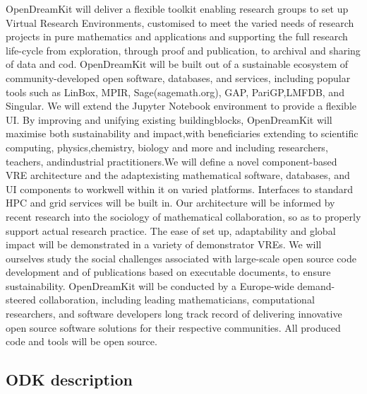 \documentclass[12pt]{amsbook}
\begin{document}
OpenDreamKit will deliver a flexible toolkit enabling research groups to set up Virtual Research Environments,
customised to meet the varied needs of research projects in pure mathematics and applications and supporting
the full research life-cycle from exploration, through proof and publication, to archival and sharing of data and
cod. OpenDreamKit will be built out of a sustainable ecosystem of community-developed open software, databases,
and services, including popular tools such as LinBox, MPIR, Sage(sagemath.org), GAP, PariGP,LMFDB, and
Singular. We will extend the Jupyter Notebook environment to provide a flexible UI. By improving and unifying
existing buildingblocks, OpenDreamKit will maximise both sustainability and impact,with beneficiaries extending
to scientific computing, physics,chemistry, biology and more and including researchers, teachers, andindustrial
practitioners.We will define a novel component-based VRE architecture and the adaptexisting mathematical software,
databases, and UI components to workwell within it on varied platforms. Interfaces to standard HPC and  grid
services will be built in. Our architecture will be informed by recent research into the sociology of mathematical
collaboration, so as to properly support actual research practice. The ease of set up, adaptability and global impact
will be demonstrated in a variety of demonstrator VREs. We will ourselves study the social challenges associated
with large-scale open source code development and of publications based on executable documents, to ensure
sustainability. OpenDreamKit will be conducted by a Europe-wide demand-steered collaboration, including leading
mathematicians, computational researchers, and software developers long track record of delivering innovative open
source software solutions for their respective communities. All produced code and tools will be open source.

\subsection{ODK description}
\end{document}
